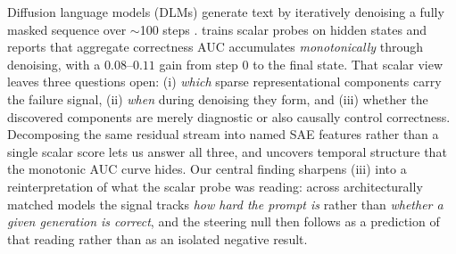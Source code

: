 \documentclass[11pt]{article}
\begin{document}
Diffusion language models (DLMs) generate text by iteratively denoising a fully masked sequence over $\sim$100 steps \citep{austin2021d3pm,sahoo2024simple,lou2024discrete,nie2025llada,ye2025dream}.
\citet{chiu2026probe} trains scalar probes on hidden states and reports that aggregate correctness AUC accumulates \emph{monotonically} through denoising, with a $0.08$--$0.11$ gain from step $0$ to the final state.
That scalar view leaves three questions open: (i) \emph{which} sparse representational components carry the failure signal, (ii) \emph{when} during denoising they form, and (iii) whether the discovered components are merely diagnostic or also causally control correctness.
Decomposing the same residual stream into named SAE features rather than a single scalar score lets us answer all three, and uncovers temporal structure that the monotonic AUC curve hides.
Our central finding sharpens (iii) into a reinterpretation of what the scalar probe was reading: across architecturally matched models the signal tracks \emph{how hard the prompt is} rather than \emph{whether a given generation is correct}, and the steering null then follows as a prediction of that reading rather than as an isolated negative result.
\end{document}
